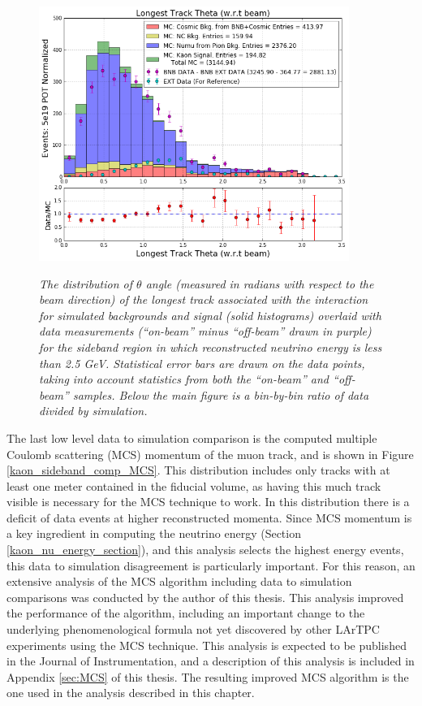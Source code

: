 \begin{figure}[ht!]
\centering
	\includegraphics[width=0.9\textwidth]{Figures/kaon_sideband_comp_theta.png} \\
\caption{\textit{The distribution of $\theta$ angle (measured in radians with respect to the beam direction) of the longest track associated with the interaction for simulated backgrounds and signal (solid histograms) overlaid with data measurements (``on-beam'' minus ``off-beam'' drawn in purple) for the sideband region in which reconstructed neutrino energy is less than 2.5 GeV. Statistical error bars are drawn on the data points, taking into account statistics from both the ``on-beam'' and ``off-beam'' samples. Below the main figure is a bin-by-bin ratio of data divided by simulation.}}\label{kaon_sideband_comp_theta}
\end{figure}

The last low level data to simulation comparison is the computed multiple Coulomb scattering (MCS) momentum of the muon track, and is shown in Figure \ref{kaon_sideband_comp_MCS}. This distribution includes only tracks with at least one meter contained in the fiducial volume, as having this much track visible is necessary for the MCS technique to work. In this distribution there is a deficit of data events at higher reconstructed momenta. Since MCS momentum is a key ingredient in computing the neutrino energy (Section \ref{kaon_nu_energy_section}), and this analysis selects the highest energy events, this data to simulation disagreement is particularly important. For this reason, an extensive analysis of the MCS algorithm including data to simulation comparisons was conducted by the author of this thesis. This analysis improved the performance of the algorithm, including an important change to the underlying phenomenological formula not yet discovered by other LArTPC experiments using the MCS technique. This analysis is expected to be published in the Journal of Instrumentation, and a description of this analysis is included in Appendix \ref{sec:MCS} of this thesis. The resulting improved MCS algorithm is the one used in the analysis described in this chapter.\\


